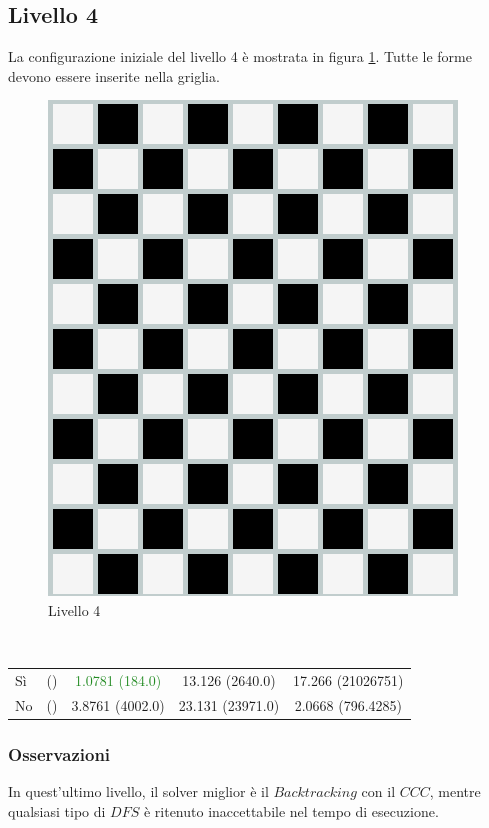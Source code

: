 \subsection{Livello 4}
La configurazione iniziale del livello 4 è mostrata in figura \ref{lev4}. Tutte le forme devono essere inserite nella griglia.
\begin{figure}[h]
	\centering
	\includegraphics[scale=0.3]{immagini/lv4}
	\caption{Livello 4}
	\label{lev4}
\end{figure}
\\
\noindent

 \begin{table} 
	\begin{tabular}{|l||*{4}{c|}}\hline 
		\backslashbox{Miglioria}{Solver} 
		&\makebox{DFS}&\makebox{Backtracking}&\makebox{Recursive Backtracking}	&\makebox{MinConflicts}\\ \hline 
		Sì& ()&\textcolor{ForestGreen}{1.0781 (184.0)}&13.126 (2640.0)&17.266 (21026751) \\ \hline 
		No& ()&3.8761 (4002.0)&23.131 (23971.0)&2.0668 (796.4285)  \\ \hline 
	\end{tabular} 
\end{table}

\subsubsection{Osservazioni}
In quest'ultimo livello, il solver miglior è il $Backtracking$ con il $CCC$, mentre qualsiasi tipo di $DFS$ è ritenuto inaccettabile nel tempo di esecuzione.\\

